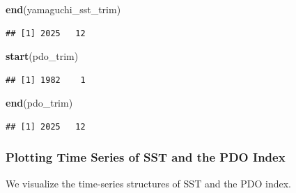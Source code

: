 \documentclass[
]{article}
\newenvironment{Shaded}{\begin{snugshade}}{\end{snugshade}}
\newcommand{\FunctionTok}[1]{\textcolor[rgb]{0.13,0.29,0.53}{\textbf{#1}}}
\newcommand{\NormalTok}[1]{#1}
\begin{document}
\begin{Shaded}
\begin{Highlighting}[]
\FunctionTok{end}\NormalTok{(yamaguchi\_sst\_trim)}
\end{Highlighting}
\end{Shaded}

\begin{verbatim}
## [1] 2025   12
\end{verbatim}

\begin{Shaded}
\begin{Highlighting}[]
\FunctionTok{start}\NormalTok{(pdo\_trim)}
\end{Highlighting}
\end{Shaded}

\begin{verbatim}
## [1] 1982    1
\end{verbatim}

\begin{Shaded}
\begin{Highlighting}[]
\FunctionTok{end}\NormalTok{(pdo\_trim)}
\end{Highlighting}
\end{Shaded}

\begin{verbatim}
## [1] 2025   12
\end{verbatim}

\subsubsection{Plotting Time Series of SST and the PDO
Index}\label{plotting-time-series-of-sst-and-the-pdo-index}

We visualize the time-series structures of SST and the PDO index.
\end{document}
